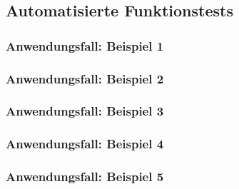 \documentclass[enabledeprecatedfontcommands,fontsize=12pt,paper=a4,twoside]{scrartcl}
\begin{document}
\subsection{Automatisierte Funktionstests}

\subsubsection{Anwendungsfall: Beispiel 1}


\subsubsection{Anwendungsfall: Beispiel 2}


\subsubsection{Anwendungsfall: Beispiel 3}


\subsubsection{Anwendungsfall: Beispiel 4}


\subsubsection{Anwendungsfall: Beispiel 5}

\end{document}
